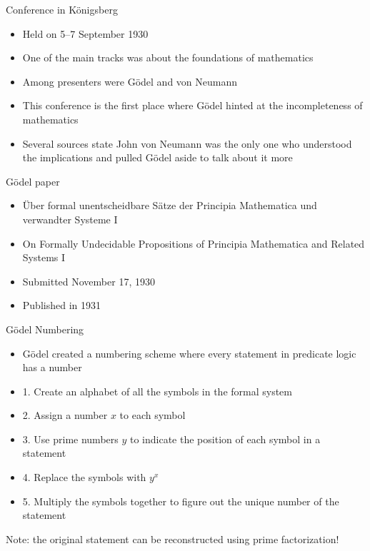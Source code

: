 \documentclass[utf8]{beamer}
\begin{document}
\begin{frame}{Conference in K{\"o}nigsberg}
\begin{itemize}
\item Held on 5–7 September 1930
\item One of the main tracks was about the foundations of mathematics
\item Among presenters were G{\"o}del and von Neumann
\item This conference is the first place where G{\"o}del hinted at the incompleteness of mathematics
\item Several sources state John von Neumann was the only one who understood the implications and pulled G{\"o}del
aside to talk about it more
\end{itemize}
\end{frame}

\begin{frame}{G{\"o}del paper}
\begin{itemize}
\item {\"U}ber formal unentscheidbare S{\"a}tze der Principia Mathematica und verwandter Systeme I
\item On Formally Undecidable Propositions of Principia Mathematica and Related Systems I
\item Submitted November 17, 1930
\item Published in 1931
\end{itemize}
\end{frame}

\begin{frame}{G{\"o}del Numbering}
\begin{itemize}
\item G{\"o}del created a numbering scheme where every statement in predicate logic has a number
\item 1. Create an alphabet of all the symbols in the formal system
\item 2. Assign a number $x$ to each symbol
\item 3. Use prime numbers $y$ to indicate the position of each symbol in a statement
\item 4. Replace the symbols with $y^x$
\item 5. Multiply the symbols together to figure out the unique number of the statement
\end{itemize}
\begin{center}
Note: the original statement can be reconstructed using prime factorization!
\end{center}
\end{frame}
\end{document}
